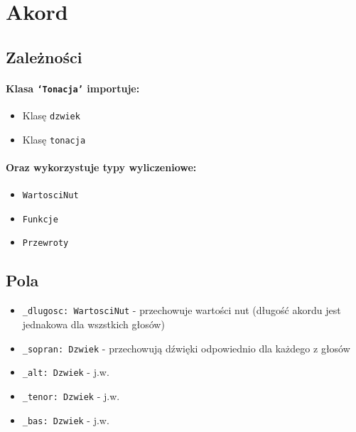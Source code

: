 \documentclass[dokumentacja.tex]{subfiles}
\begin{document}
\section{Akord}

\subsection{Zależności}
\paragraph*{Klasa \texttt{`Tonacja'} importuje:}
\begin{itemize}
    \item Klasę \texttt{dzwiek}
    \item Klasę \texttt{tonacja}
\end{itemize}
\paragraph*{Oraz wykorzystuje typy wyliczeniowe:}
\begin{itemize}
    \item \texttt{WartosciNut}
    \item \texttt{Funkcje}
    \item \texttt{Przewroty}
\end{itemize}


\subsection{Pola}
\begin{itemize}
    \item \texttt{\_dlugosc: WartosciNut} - przechowuje wartości nut (długość akordu jest jednakowa dla wszstkich głosów)
    \item \texttt{\_sopran: Dzwiek} - przechowują dźwięki odpowiednio dla każdego z głosów
    \item \texttt{\_alt: Dzwiek} - j.w.
    \item \texttt{\_tenor: Dzwiek} - j.w.
    \item \texttt{\_bas: Dzwiek} - j.w.
\end{itemize}
\end{document}
